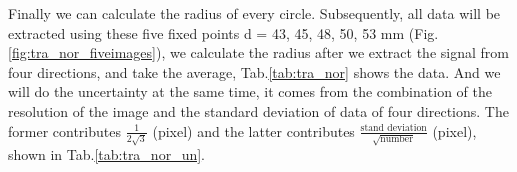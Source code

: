 \documentclass[a4paper,12pt]{article}
\begin{document}
    
    \par Finally we can calculate the radius of every circle. Subsequently, all data will be extracted using these five fixed points d = 43, 45, 48, 50, 53 mm (Fig.\ref{fig:tra_nor_fiveimages}), we calculate the radius after we extract the signal from four directions, and take the average, Tab.\ref{tab:tra_nor} shows the data. And we will do the uncertainty at the same time, it comes from the combination of the resolution of the image and the standard deviation of data of four directions. The former contributes $\frac{1}{2\sqrt{3}} $ (pixel) and the latter contributes $\frac{\text{stand deviation}}{\sqrt{\text{number}}} $ (pixel), shown in Tab.\ref{tab:tra_nor_un}.
    
    \begin{figure}[H]
      \centering
      

\end{figure}
\end{document}
